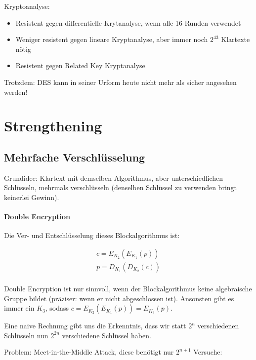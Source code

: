 Kryptoanalyse: 

\begin{itemize}
    \item Resistent gegen differentielle Krytanalyse, wenn alle 16 Runden verwendet
    \item Weniger resistent gegen lineare Kryptanalyse, aber immer noch $2^{43}$ Klartexte nötig
    \item Resistent gegen Related Key Kryptanalyse
\end{itemize}

Trotzdem: DES kann in seiner Urform heute nicht mehr als sicher angesehen werden!


\section{Strengthening}

\subsection{Mehrfache Verschlüsselung}

Grundidee: Klartext mit demselben Algorithmus, aber unterschiedlichen Schlüsseln, mehrmals verschlüsseln (denselben Schlüssel zu verwenden bringt keinerlei Gewinn).

\paragraph{Double Encryption}

Die Ver- und Entschlüsselung dieses Blockalgorithmus ist:

\begin{align*}
    c = E_{K_2}\left( E_{K_1}(p) \right) \\
    p = D_{K_1}\left( D_{K_2}(c) \right) \\
\end{align*}

Double Encryption ist nur sinnvoll, wenn der Blockalgorithmus keine algebraische Gruppe bildet (präziser: wenn er nicht abgeschlossen ist). Ansonsten gibt es immer ein 
$K_3$, sodass $c = E_{K_2}\left( E_{K_1}(p) \right) = E_{K_3}(p)$.

Eine naive Rechnung gibt uns die Erkenntnis, dass wir statt $2^n$ verschiedenen Schlüsseln nun $2^{2n}$ verschiedene Schlüssel haben.

Problem: Meet-in-the-Middle Attack, diese benötigt nur $2^{n+1}$ Versuche:

